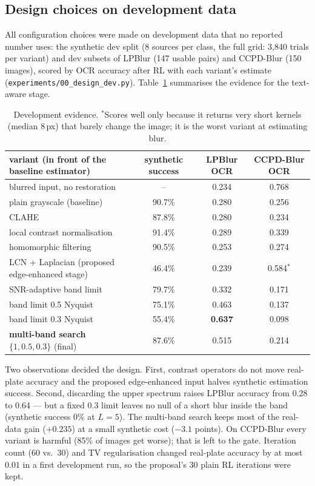 \subsection{Design choices on development data}
\label{sec:design}
All configuration choices were made on development data that no reported number uses: the
synthetic dev split (8 sources per class, the full grid: 3{,}840 trials per variant) and dev
subsets of LPBlur (147 usable pairs) and CCPD-Blur (150 images), scored by OCR accuracy after RL with
each variant's estimate (\texttt{experiments/00\_design\_dev.py}). Table~\ref{tab:design}
summarises the evidence for the text-aware stage.

\begin{table}[h]
\centering\small
\begin{tabular}{lccc}
\toprule
variant (in front of the baseline estimator) & synthetic success & LPBlur OCR & CCPD-Blur OCR \\
\midrule
blurred input, no restoration & -- & 0.234 & 0.768 \\
plain grayscale (baseline) & 90.7\% & 0.280 & 0.256 \\
CLAHE & 87.8\% & 0.280 & 0.234 \\
local contrast normalisation & 91.4\% & 0.289 & 0.339 \\
homomorphic filtering & 90.5\% & 0.253 & 0.274 \\
LCN + Laplacian (proposed edge-enhanced stage) & 46.4\% & 0.239 & 0.584$^\ast$ \\
SNR-adaptive band limit & 79.7\% & 0.332 & 0.171 \\
band limit 0.5 Nyquist & 75.1\% & 0.463 & 0.137 \\
band limit 0.3 Nyquist & 55.4\% & \textbf{0.637} & 0.098 \\
\textbf{multi-band search} $\{1, 0.5, 0.3\}$ (final) & 87.6\% & 0.515 & 0.214 \\
\bottomrule
\end{tabular}
\caption{Development evidence. $^\ast$Scores well only because it returns very short kernels
(median 8\,px) that barely change the image; it is the worst variant at estimating blur.}
\label{tab:design}
\end{table}

Two observations decided the design. First, contrast operators do not move real-plate accuracy and
the proposed edge-enhanced input halves synthetic estimation success. Second, discarding the upper
spectrum raises LPBlur accuracy from 0.28 to 0.64 --- but a fixed 0.3 limit leaves no null of a
short blur inside the band (synthetic success 0\% at $L=5$). The multi-band search keeps most of the
real-data gain ($+0.235$) at a small synthetic cost ($-3.1$ points). On CCPD-Blur every variant is
harmful (85\% of images get worse); that is left to the gate. Iteration count (60 vs.\ 30) and TV
regularisation changed real-plate accuracy by at most $0.01$ in a first development run, so the
proposal's 30 plain RL iterations were kept.
